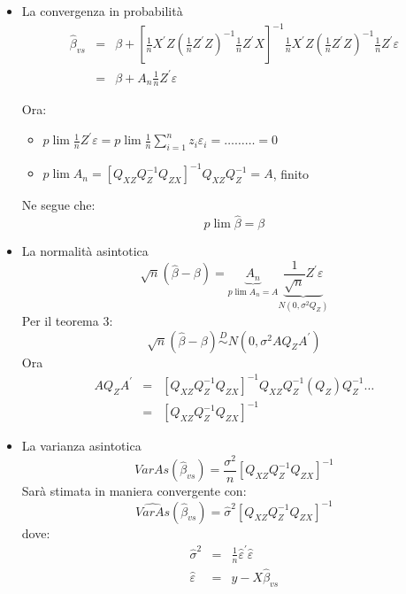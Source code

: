 \documentclass[a4paper]{report}
\theoremstyle{remark}
\begin{document}
\begin{itemize}
\item La convergenza in probabilit\`{a} 
\begin{eqnarray*}
\widehat{\beta }_{vs} &=&\beta +\left[ \frac{1}{n}X^{\prime }Z(\frac{1}{n}%
Z^{\prime }Z)^{-1}\frac{1}{n}Z^{\prime }X\right] ^{-1}\frac{1}{n}X^{\prime
}Z(\frac{1}{n}Z^{\prime }Z)^{-1}\frac{1}{n}Z^{\prime }\varepsilon \\
&=&\beta +A_{n}\frac{1}{n}Z^{\prime }\varepsilon
\end{eqnarray*}

Ora:

\begin{itemize}
\item $p\lim \frac{1}{n}Z^{\prime }\varepsilon =p\lim \frac{1}{n}%
\sum_{i=1}^{n}z_{i}\varepsilon _{i}=\ldots \ldots \ldots =0$

\item $p\lim A_{n}=\left[ Q_{XZ}Q_{Z}^{-1}Q_{ZX}\right]
^{-1}Q_{XZ}Q_{Z}^{-1}=A$, finito
\end{itemize}

Ne segue che: 
\begin{equation*}
p\lim \hat{\beta}=\beta
\end{equation*}

\item La normalit\`{a} asintotica 
\begin{equation*}
\sqrt{n}(\widehat{\beta }-\beta )=\underset{p\lim A_{n}=A}{\underbrace{A_{n}}%
}\underset{N(0,\sigma ^{2}Q_{Z})}{\underbrace{\frac{1}{\sqrt{n}}Z^{\prime
}\varepsilon }}
\end{equation*}%
Per il teorema 3: 
\begin{equation*}
\sqrt{n}(\widehat{\beta }-\beta )\overset{D}{\sim }N(0,\sigma
^{2}AQ_{Z}A^{\prime })
\end{equation*}%
Ora%
\begin{eqnarray*}
AQ_{Z}A^{\prime } &=&\left[ Q_{XZ}Q_{Z}^{-1}Q_{ZX}\right]
^{-1}Q_{XZ}Q_{Z}^{-1}(Q_{Z})Q_{Z}^{-1}\ldots \\
&=&\left[ Q_{XZ}Q_{Z}^{-1}Q_{ZX}\right] ^{-1}
\end{eqnarray*}

\item {La varianza asintotica} 
\begin{equation*}
VarAs(\hat{\beta}_{vs})=\frac{\sigma ^{2}}{n}\left[ Q_{XZ}Q_{Z}^{-1}Q_{ZX}%
\right] ^{-1}
\end{equation*}%
Sar\`{a} stimata in maniera convergente con: 
\begin{equation*}
\widehat{VarAs}(\hat{\beta}_{vs})=\hat{\sigma}^{2}\left[
Q_{XZ}Q_{Z}^{-1}Q_{ZX}\right] ^{-1}
\end{equation*}%
dove: 
\begin{eqnarray*}
\hat{\sigma}^{2} &=&\frac{1}{n}\hat{\varepsilon}^{\prime }\hat{\varepsilon}
\\
\hat{\varepsilon} &=&y-X\hat{\beta}_{vs}
\end{eqnarray*}
\end{itemize}
\end{document}
